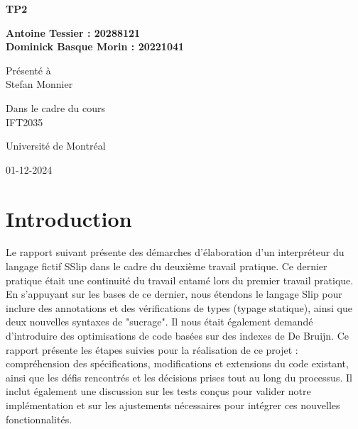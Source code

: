 \documentclass{article}
\begin{document}
\raggedright
\begin{titlepage}
    \begin{center}
  
 
        \Huge
        \textbf{TP2}\\
        \vspace{0.5cm}
 
        \vspace{3.5cm}
        
        \large
       \textbf{
        Antoine Tessier : 20288121 \\
        Dominick Basque Morin : 20221041
        }
        \vspace{3.5cm}
 
        Présenté à\\ 
        Stefan Monnier
        
        \vspace{3.5cm}
        
        Dans le cadre du cours\\
        IFT2035

         \vspace{3.5cm}
        
        Université de Montréal

        \vspace{2.5mm}
        01-12-2024

    \end{center}
\end{titlepage}

\section{Introduction}
\begin{justify}
Le rapport suivant présente des démarches d'élaboration d'un interpréteur du langage fictif SSlip dans le cadre du deuxième travail pratique. Ce dernier pratique était une continuité du travail entamé lors du premier travail pratique. En s'appuyant sur les bases de ce dernier, nous étendons le langage Slip pour inclure des annotations et des vérifications de types (typage statique), ainsi que deux nouvelles syntaxes de "sucrage". Il nous était également demandé d'introduire des optimisations de code basées sur des indexes de De Bruijn. Ce rapport présente les étapes suivies pour la réalisation de ce projet : compréhension des spécifications, modifications et extensions du code existant, ainsi que les défis rencontrés et les décisions prises tout au long du processus. Il inclut également une discussion sur les tests conçus pour valider notre implémentation et sur les ajustements nécessaires pour intégrer ces nouvelles fonctionnalités.
\end{justify}
\end{document}
